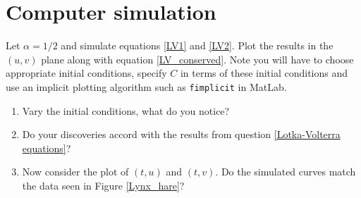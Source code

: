\documentclass[]{article}
\newcommand{\fig}[1]{Figure \ref{#1}}
\newcommand{\eqn}[1]{equation \eqref{#1}}
\newcommand{\eqns}[2]{equations \eqref{#1} and \eqref{#2}}
\begin{document}
\section{Computer simulation}
Let $\alpha=1/2$ and simulate \eqns{LV1}{LV2}. Plot the results in the $(u,v)$ plane along with \eqn{LV_conserved}. Note you will have to choose appropriate initial conditions, specify $C$ in terms of these initial conditions and use an implicit plotting algorithm such as \texttt{fimplicit} in MatLab.
\begin{enumerate}
\item Vary the initial conditions, what do you notice?
\item Do your discoveries accord with the results from question \ref{Lotka-Volterra equations}?
\item Now consider the plot of $(t,u)$ and $(t,v)$. Do the simulated curves match the data seen in \fig{Lynx_hare}?
\end{enumerate}
\end{document}
